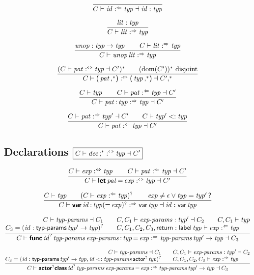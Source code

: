 $$
\frac{
}{
  C \vdash \x{id} \anal \x{typ} \dashv \x{id} : \x{typ}
}
$$

$$
\frac{
  \x{lit} : \x{typ}
}{
  C \vdash \x{lit} \synth \x{typ}
}
$$

$$
\frac{
  \x{unop} : \x{typ} \Kto \x{typ}
  \qquad
  C \vdash \x{lit} \synth \x{typ}
}{
  C \vdash \x{unop} \x{lit} \synth \x{typ}
}
$$

$$
\frac{
  (C \vdash \x{pat} \analsynth \x{typ} \dashv C')^\ast
  \qquad
  (\Dom(C'))^\ast ~\text{disjoint}
}{
  C \vdash \K( \x{pat}\K,^\ast \K) \analsynth \K( \x{typ}\K,^\ast \K) \dashv C',^\ast
}
$$

$$
\frac{
  C \vdash \x{typ}
  \qquad
  C \vdash \x{pat} \anal \x{typ} \dashv C'
}{
  C \vdash \x{pat} \K: \x{typ} \synth \x{typ} \dashv C'
}
$$

$$
\frac{
  C \vdash \x{pat} \synth \x{typ}' \dashv C'
  \qquad
  C \vdash \x{typ}' <: \x{typ}
}{
  C \vdash \x{pat} \anal \x{typ} \dashv C'
}
$$


\subsection*{Declarations \hfill $\boxed{C \vdash \x{dec}\K;^\ast \analsynth \x{typ} \dashv C'}$}

$$
\frac{
  C \vdash \x{exp} \analsynth \x{typ}
  \qquad
  C \vdash \x{pat} \anal \x{typ} \dashv C'
}{
  C \vdash \KK{let} \x{pat} \K= \x{exp} \analsynth \x{typ} \dashv C'
}
$$

$$
\frac{
  C \vdash \x{typ}
  \qquad
  (C \vdash \x{exp} \anal \x{typ})^?
  \qquad
  \x{exp} \neq \epsilon \vee \x{typ} = \x{typ}' \K?
}{
  C \vdash \KK{var} \x{id} \K: \x{typ} (\K= \x{exp})^? \synth \K{var} \x{typ} \dashv \x{id} : \K{var} \x{typ}
}
$$

$$
\frac{
  \begin{array}{@{}r@{\qquad}l@{}}
  C \vdash \x{typ-params} \dashv C_1
  &
  C, C_1 \vdash \x{exp-params} : \x{typ}' \dashv C_2
  \qquad
  C, C_1 \vdash \x{typ}
  \\
  C_3 = (\x{id} : \K{typ-params} \x{typ}' \Kto \x{typ})^?
  &
  C, C_1, C_2, C_3, \K{return} : \K{label} \x{typ} \vdash \x{exp} \anal \x{typ}
  \end{array}
}{
  C \vdash \KK{func} \x{id}^? \x{typ-params} \x{exp-params} \K: \x{typ} \K= \x{exp} \synth \x{typ-params} \x{typ}' \Kto \x{typ} \dashv C_3
}
$$

$$
\frac{
  \begin{array}{@{}r@{\qquad}l@{}}
  C \vdash \x{typ-params} \dashv C_1
  &
  C, C_1 \vdash \x{exp-params} : \x{typ}' \dashv C_2
  \\
  C_3 = (\x{id} : \K{typ-params} \x{typ}' \Kto \x{typ}, \x{id} <: \x{typ-params} \K{actor}^? \x{typ})^?
  &
  C, C_1, C_2, C_3 \vdash \x{exp} \synth \x{typ}
  \end{array}
}{
  C \vdash \KK{actor}^? \KK{class} \x{id}^? \x{typ-params} \x{exp-params} \K= \x{exp} \synth \x{typ-params} \x{typ}' \Kto \x{typ} \dashv C_3
}
$$

